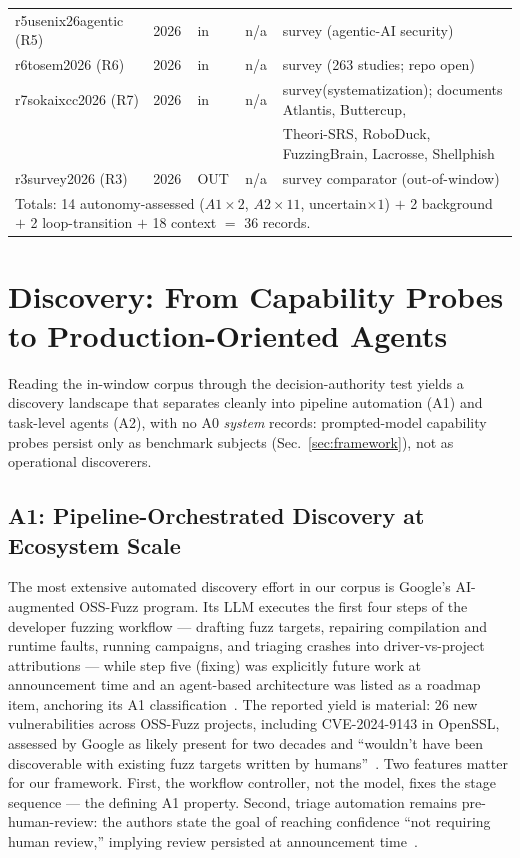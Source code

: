 \documentclass[conference,compsoc]{IEEEtran}
\begin{document}
\begin{table}[t]
{\begin{tabular}{lllll}
r5usenix26agentic (R5)   & 2026 & in & n/a & survey (agentic-AI security) \\
r6tosem2026 (R6)        & 2026 & in & n/a & survey (263 studies; repo open) \\
r7sokaixcc2026 (R7)      & 2026 & in & n/a & survey(systematization); documents Atlantis, Buttercup,\\
                         &      &    &     & Theori-SRS, RoboDuck, FuzzingBrain, Lacrosse, Shellphish \\
r3survey2026 (R3) & 2026 & OUT& n/a & survey comparator (out-of-window) \\
\hline
\multicolumn{5}{l}{\scriptsize Totals: 14 autonomy-assessed ($A1{\times}2$, $A2{\times}11$, uncertain${\times}1$)
$+$ 2 background $+$ 2 loop-transition $+$ 18 context $=$ 36 records.}\\
\end{tabular}
}
\end{table}


\section{Discovery: From Capability Probes to Production-Oriented Agents}
\label{sec:discovery}

Reading the in-window corpus through the decision-authority test yields a discovery landscape
that separates cleanly into pipeline automation (A1) and task-level agents (A2), with no A0
\emph{system} records: prompted-model capability probes persist only as benchmark subjects
(Sec.~\ref{sec:framework}), not as operational discoverers.

\subsection{A1: Pipeline-Orchestrated Discovery at Ecosystem Scale}
The most extensive automated discovery effort in our corpus is Google's AI-augmented
OSS-Fuzz program. Its LLM executes the first four steps of the developer fuzzing workflow ---
drafting fuzz targets, repairing compilation and runtime faults, running campaigns, and
triaging crashes into driver-vs-project attributions --- while step five (fixing) was
explicitly future work at announcement time and an agent-based architecture was listed as a
roadmap item, anchoring its A1 classification~\cite{ossfuzz-levelingup-2024}. The reported yield is
material: 26 new vulnerabilities across OSS-Fuzz projects, including CVE-2024-9143 in OpenSSL,
assessed by Google as likely present for two decades and ``wouldn't have been discoverable with
existing fuzz targets written by humans''~\cite{ossfuzz-levelingup-2024}. Two features matter for our
framework. First, the workflow controller, not the model, fixes the stage sequence --- the
defining A1 property. Second, triage automation remains pre-human-review: the authors state the
goal of reaching confidence ``not requiring human review,'' implying review persisted at
announcement time~\cite{ossfuzz-levelingup-2024}.
\end{document}
